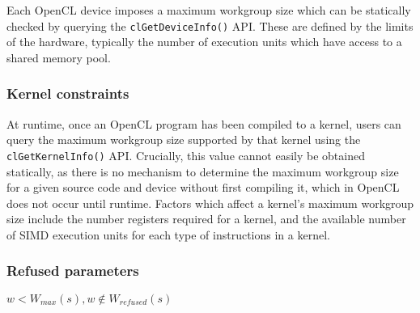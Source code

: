 Each OpenCL device imposes a maximum workgroup size which can be
statically checked by querying the \texttt{clGetDeviceInfo()}
API. These are defined by the limits of the hardware, typically the
number of execution units which have access to a shared memory pool.

\subsubsection{Kernel constraints}

At runtime, once an OpenCL program has been compiled to a kernel,
users can query the maximum workgroup size supported by that kernel
using the \texttt{clGetKernelInfo()} API. Crucially, this value cannot
easily be obtained statically, as there is no mechanism to determine
the maximum workgroup size for a given source code and device without
first compiling it, which in OpenCL does not occur until
runtime. Factors which affect a kernel's maximum workgroup size
include the number registers required for a kernel, and the available
number of SIMD execution units for each type of instructions in a
kernel.

\subsubsection{Refused parameters}

$w < W_{max}(s), w \not\in W_{refused}(s)$

\begin{table}

\caption{%
  Specification of experimental platforms.%
}
\label{tab:hosts}
\end{table}

\begin{table}

\caption{%
  Specification of experimental OpenCL devices.%
}
\label{tab:hw}
\end{table}

\begin{table}

\caption{%
  Benchmark applications, border sizes, and static instruction counts.
  The ``simple'' and ``complex'' kernels are synthetic training
  programs.  %
}
\label{tab:kernels}
\end{table}

\begin{table}

\caption{%
  Datasets used.%
}
\label{tab:datasets}
\end{table}


